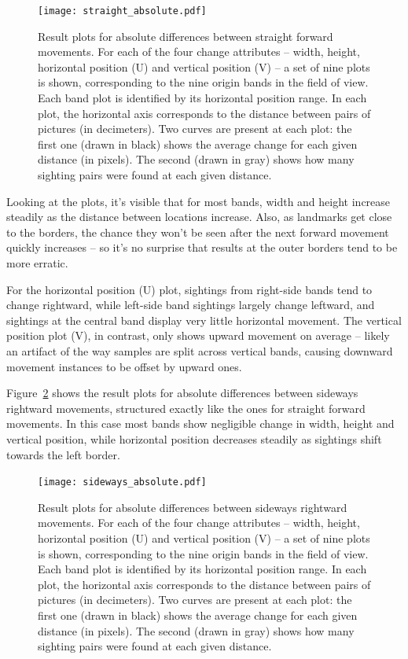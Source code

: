 \documentclass[twocolumn, 9pt]{jsproceedings}
\begin{document}
\begin{figure}[h!]
\texttt{[image: straight\_absolute.pdf]}
\caption{Result plots for absolute differences between straight forward movements. For each of the four change attributes -- width, height, horizontal position (U) and vertical position (V) -- a set of nine plots is shown, corresponding to the nine origin bands in the field of view. Each band plot is identified by its horizontal position range. In each plot, the horizontal axis corresponds to the distance between pairs of pictures (in decimeters). Two curves are present at each plot: the first one (drawn in black) shows the average change for each given distance (in pixels). The second (drawn in gray) shows how many sighting pairs were found at each given distance.}
\label{fig:straight_absolute}
\end{figure}

Looking at the plots, it's visible that for most bands, width and height increase steadily as the distance between locations increase. Also, as landmarks get close to the borders, the chance they won't be seen after the next forward movement quickly increases -- so it's no surprise that results at the outer borders tend to be more erratic.

For the horizontal position (U) plot, sightings from right-side bands tend to change rightward, while left-side band sightings largely change leftward, and sightings at the central band display very little horizontal movement. The vertical position plot (V), in contrast, only shows upward movement on average -- likely an artifact of the way samples are split across vertical bands, causing downward movement instances to be offset by upward ones.

Figure~\ref{fig:sideways_absolute} shows the result plots for absolute differences between sideways rightward movements, structured exactly like the ones for straight forward movements. In this case most bands show negligible change in width, height and vertical position, while horizontal position decreases steadily as sightings shift towards the left border.

\begin{figure}[h!]
\texttt{[image: sideways\_absolute.pdf]}
\caption{Result plots for absolute differences between sideways rightward movements. For each of the four change attributes -- width, height, horizontal position (U) and vertical position (V) -- a set of nine plots is shown, corresponding to the nine origin bands in the field of view. Each band plot is identified by its horizontal position range. In each plot, the horizontal axis corresponds to the distance between pairs of pictures (in decimeters). Two curves are present at each plot: the first one (drawn in black) shows the average change for each given distance (in pixels). The second (drawn in gray) shows how many sighting pairs were found at each given distance.}
\label{fig:sideways_absolute}
\end{figure}
\end{document}
